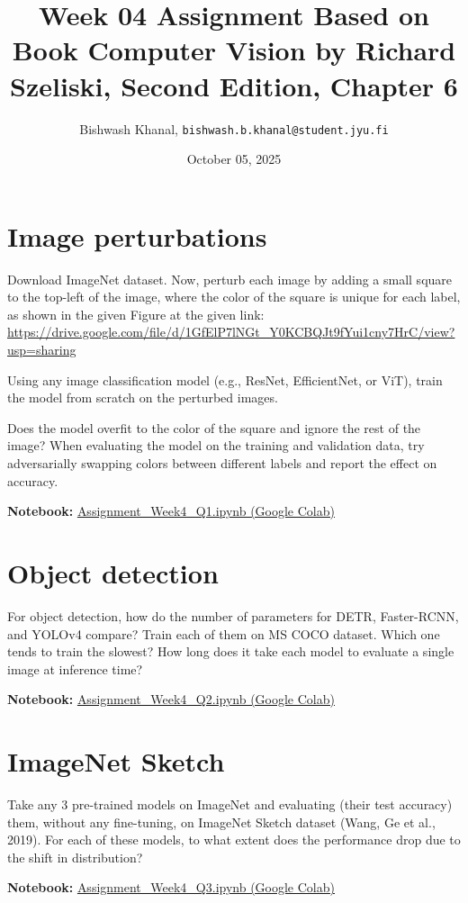\documentclass[12pt,a4paper]{article}
\title{Week 04 Assignment Based on Book Computer Vision by Richard Szeliski, Second Edition, Chapter 6}
\author{Bishwash Khanal, \texttt{bishwash.b.khanal@student.jyu.fi}}
\date{October 05, 2025}
\begin{document}
\maketitle

\section{Image perturbations}
Download ImageNet dataset. Now, perturb each image by adding a small square to the top-left of the image, where the color of the square is unique for 
each label, as shown in the given Figure at the given link: \url{https://drive.google.com/file/d/1GfElP7lNGt_Y0KCBQJt9fYui1cny7HrC/view?usp=sharing}


Using any image classification model (e.g., ResNet, EfficientNet, or ViT), train the model from scratch on the perturbed images.


Does the model overfit to the color of the square and ignore the rest of the image? When evaluating the model on the training and validation data, 
try adversarially swapping colors between different labels and report the effect on accuracy.

\textbf{Notebook:} \href{https://colab.research.google.com/drive/1own6DpmdM8Nlx5oqRM8h9s4naU_R6tED?usp=sharing}{Assignment\_Week4\_Q1.ipynb (Google Colab)}


\section{Object detection}
For object detection, how do the number of parameters for DETR, Faster-RCNN, and YOLOv4 compare? Train each of them on MS COCO dataset. 
Which one tends to train the slowest? How long does it take each model to evaluate a single image at inference time?

\textbf{Notebook:} \href{https://colab.research.google.com/drive/15lZexKpMhi8YTQSRUhzudx96gLgtdNkc?usp=sharing}{Assignment\_Week4\_Q2.ipynb (Google Colab)}

\section{ImageNet Sketch}
Take any 3 pre-trained models on ImageNet and evaluating (their test accuracy) them, without any fine-tuning, on ImageNet Sketch dataset 
(Wang, Ge et al., 2019). For each of these models, to what extent does the performance drop due to the shift in distribution?

\textbf{Notebook:} \href{https://colab.research.google.com/drive/1iXdk22CjFKFREb8IFVXQX4Lbwdluaqp-?usp=sharing}{Assignment\_Week4\_Q3.ipynb (Google Colab)}
\end{document}
